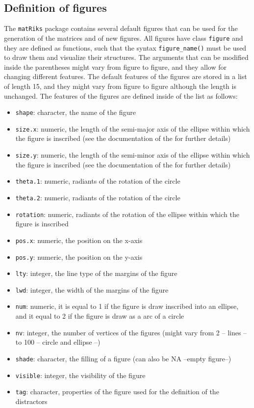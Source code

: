 \subsection{Definition of figures}\label{definition-of-figures}

The \texttt{matRiks} package contains several default figures that can be used for the generation of the matrices and of new figures.
All figures have class \texttt{figure} and they are defined as functions, such that the syntax \texttt{figure\_name()} must be used to draw them and visualize their structures.
The arguments that can be modified inside the parentheses might vary from figure to figure, and they allow for changing different features.
The default features of the figures are stored in a list of length 15, and they might vary from figure to figure although the length is unchanged.
The features of the figures are defined inside of the list as follows:

\begin{itemize}
\tightlist
\item
  \texttt{shape}: character, the name of the figure
\item
  \texttt{size.x}: numeric, the length of the semi-major axis of the ellipse within which the figure is inscribed (see the documentation of the  for further details)
\item
  \texttt{size.y}: numeric, the length of the semi-minor axis of the ellipse within which the figure is inscribed (see the documentation of the  for further details)
\item
  \texttt{theta.1}: numeric, radiants of the rotation of the circle
\item
  \texttt{theta.2}: numeric, radiants of the rotation of the circle
\item
  \texttt{rotation}: numeric, radiants of the rotation of the ellipse within which the figure is inscribed
\item
  \texttt{pos.x}: numeric, the position on the x-axis
\item
  \texttt{pos.y}: numeric, the position on the y-axis
\item
  \texttt{lty}: integer, the line type of the margins of the figure
\item
  \texttt{lwd}: integer, the width of the margins of the figure
\item
  \texttt{num}: numeric, it is equal to 1 if the figure is draw inscribed into an ellipse, and it equal to 2 if the figure is draw as a arc of a circle
\item
  \texttt{nv}: integer, the number of vertices of the figures (might vary from 2 -- lines -- to 100 -- circle and ellipse --)
\item
  \texttt{shade}: character, the filling of a figure (can also be NA --empty figure--)
\item
  \texttt{visible}: integer, the visibility of the figure
\item
  \texttt{tag}: character, properties of the figure used for the definition of the distractors
\end{itemize}

